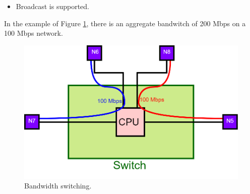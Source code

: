 \begin{itemize}
{\begin{itemize}
\item{Broadcast is supported.}
\end{itemize}
In the example of Figure \ref{bandwidth_switch}, there is an aggregate bandwitch of 200 Mbps on a 100 Mbps network.
\begin{figure}[H]
\centering
\includegraphics[scale=0.4]{Images/Layer2/bandwidth_switch}
\caption{\footnotesize{Bandwidth switching.}}\label{bandwidth_switch}
\end{figure}
}
\end{itemize}

